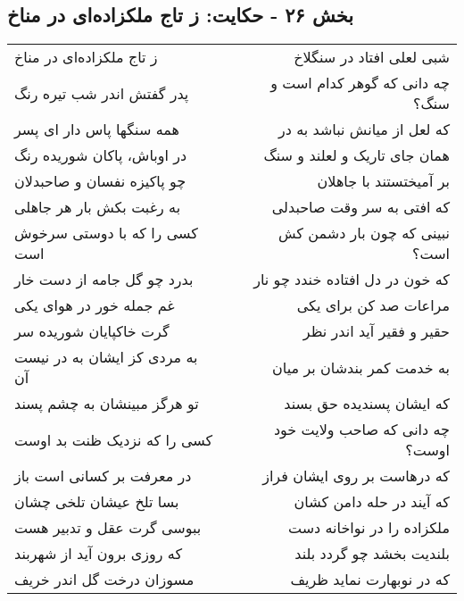 \begin{center}
\section*{بخش ۲۶ - حکایت: ز تاج ملکزاده‌ای در مناخ}
\label{sec:026}
\begin{longtable}{l p{0.5cm} r}
ز تاج ملکزاده‌ای در مناخ
&&
شبی لعلی افتاد در سنگلاخ
\\
پدر گفتش اندر شب تیره رنگ
&&
چه دانی که گوهر کدام است و سنگ؟
\\
همه سنگها پاس دار ای پسر
&&
که لعل از میانش نباشد به در
\\
در اوباش، پاکان شوریده رنگ
&&
همان جای تاریک و لعلند و سنگ
\\
چو پاکیزه نفسان و صاحبدلان
&&
بر آمیختستند با جاهلان
\\
به رغبت بکش بار هر جاهلی
&&
که افتی به سر وقت صاحبدلی
\\
کسی را که با دوستی سرخوش است
&&
نبینی که چون بار دشمن کش است؟
\\
بدرد چو گل جامه از دست خار
&&
که خون در دل افتاده خندد چو نار
\\
غم جمله خور در هوای یکی
&&
مراعات صد کن برای یکی
\\
گرت خاکپایان شوریده سر
&&
حقیر و فقیر آید اندر نظر
\\
به مردی کز ایشان به در نیست آن
&&
به خدمت کمر بندشان بر میان
\\
تو هرگز مبینشان به چشم پسند
&&
که ایشان پسندیده حق بسند
\\
کسی را که نزدیک ظنت بد اوست
&&
چه دانی که صاحب ولایت خود اوست؟
\\
در معرفت بر کسانی است باز
&&
که درهاست بر روی ایشان فراز
\\
بسا تلخ عیشان تلخی چشان
&&
که آیند در حله دامن کشان
\\
ببوسی گرت عقل و تدبیر هست
&&
ملکزاده را در نواخانه دست
\\
که روزی برون آید از شهربند
&&
بلندیت بخشد چو گردد بلند
\\
مسوزان درخت گل اندر خریف
&&
که در نوبهارت نماید ظریف
\\
\end{longtable}
\end{center}
